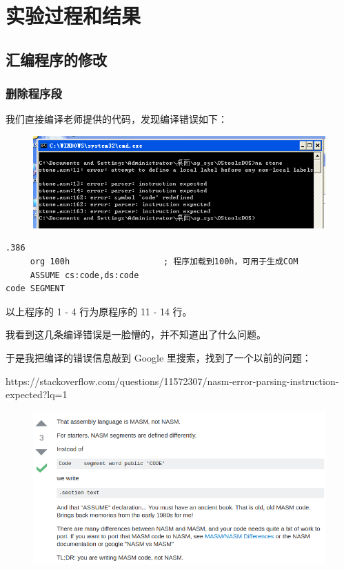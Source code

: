\documentclass{article}
\begin{document}
\section{实验过程和结果}

\subsection{汇编程序的修改}

\subsubsection{删除程序段}

我们直接编译老师提供的代码，发现编译错误如下：

\begin{figure}[!hbp]
	\centering
	\includegraphics[scale=0.6]{pics/1.png}
\end{figure}

\begin{lstlisting}[language={[x86masm]Assembler}]
     .386
     org 100h					; 程序加载到100h，可用于生成COM
     ASSUME cs:code,ds:code
code SEGMENT
\end{lstlisting}

以上程序的 1 - 4 行为原程序的 11 - 14 行。

我看到这几条编译错误是一脸懵的，并不知道出了什么问题。

于是我把编译的错误信息敲到 Google 里搜索，找到了一个以前的问题：

https://stackoverflow.com/questions/11572307/nasm-error-parsing-instruction-expected?lq=1

\begin{figure}[!hbp]
	\centering
	\includegraphics[scale=0.6]{pics/2.png}
\end{figure}
\end{document}
